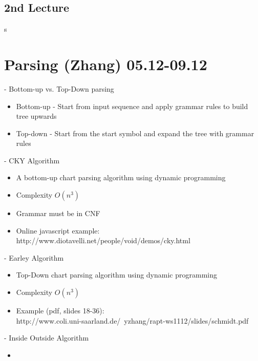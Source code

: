 \documentclass[11pt]{article}
\begin{document}
\subsection{2nd Lecture}
s



\section{Parsing (Zhang) 05.12-09.12}

- Bottom-up vs. Top-Down parsing
\begin{itemize}
 \item Bottom-up - Start from input sequence and apply grammar rules to build tree upwards
 \item Top-down - Start from the start symbol and expand the tree with grammar rules
\end{itemize}
- CKY Algorithm
\begin{itemize}
 \item A bottom-up chart parsing algorithm using dynamic programming
 \item Complexity $O(n^3)$ 
 \item Grammar must be in CNF
 \item Online javascript example: http://www.diotavelli.net/people/void/demos/cky.html
\end{itemize}
- Earley Algorithm
\begin{itemize}
 \item Top-Down chart parsing algorithm using dynamic programming
 \item Complexity $O(n^3)$
 \item Example (pdf, slides 18-36): \\http://www.coli.uni-saarland.de/~yzhang/rapt-ws1112/slides/schmidt.pdf
\end{itemize}
- Inside Outside Algorithm
\begin{itemize}
 \item 
\end{itemize}
\end{document}
